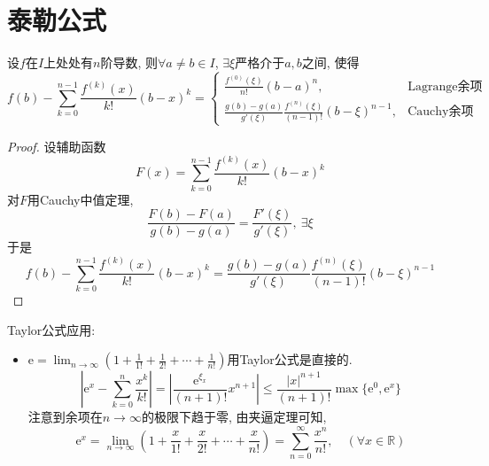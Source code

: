 
\section{泰勒公式}
\begin{theorem}
    设$f$在$I$上处处有$n$阶导数, 则$\forall a \neq b \in  I$, $\exists \xi $严格介于$a,b$之间, 使得
    \begin{equation}
      f\left( b \right) - \sum_{k=0}^{n-1} \frac{f^{(k)}\left( x \right) }{k!} \left( b-x \right) ^{k} =
      \begin{cases}
        \frac{f^{(0)}\left( \xi \right) }{n!} \left( b-a \right)^{n}, &\text{Lagrange余项}
        \\
        \frac{g\left( b \right) - g\left( a \right) }{g'\left( \xi \right) } \frac{f^{(n)}\left( \xi \right) }{\left( n-1 \right) !}\left( b - \xi \right) ^{n-1} ,& \text{Cauchy余项}
      \end{cases}
    \end{equation}
\end{theorem}
\begin{proof}
    设辅助函数
    \begin{equation}
      F\left( x \right) = \sum_{k=0}^{n-1} \frac{f^{(k)}\left( x \right) }{k!} \left( b-x \right) ^{k}
    \end{equation}
    对$F$用Cauchy中值定理, 
    \begin{equation}
      \frac{F\left( b \right) - F\left( a \right) }{g\left( b \right) - g\left( a \right) } = \frac{F'\left( \xi \right) }{g'\left( \xi \right) }, \ \exists \xi
    \end{equation}
    于是
    \begin{equation}
      f\left( b \right) - \sum_{k=0}^{n-1} \frac{f^{(k)}\left( x \right) }{k!} \left( b-x \right) ^{k} = \frac{g\left( b \right) - g\left( a \right) }{g'\left( \xi \right) } \frac{f^{(n)}\left( \xi \right) }{\left( n-1 \right) !}\left( b - \xi \right) ^{n-1}
    \end{equation}
\end{proof}

Taylor公式应用:
\begin{itemize}
    \item $\displaystyle \mathrm{e} = \lim_{n \to \infty}\left( 1 + \frac{1}{1!} + \frac{1}{2!} + \cdots + \frac{1}{n!} \right) $用Taylor公式是直接的.
    \begin{equation}
      \left| \mathrm{e}^{x} - \sum_{k=0}^{n} \frac{x^{k}}{k!} \right| = \left| \frac{\mathrm{e}^{\xi_{x}}}{\left( n+1 \right) !}x^{n+1} \right| \le \frac{\left| x \right| ^{n+1}}{\left( n+1 \right)!} \max \{ \mathrm{e}^{0}, \mathrm{e}^{x} \}
    \end{equation}
    注意到余项在$n\to \infty$的极限下趋于零, 由夹逼定理可知, 
    \begin{equation}
      \mathrm{e}^{x} = \lim_{n \to \infty} \left( 1 + \frac{x}{1!} + \frac{x}{2!} + \cdots + \frac{x}{n!} \right) = \sum_{n=0}^{\infty} \frac{x^{n}}{n!}, \quad \left( \forall x \in \mathbb{R} \right) 
    \end{equation}
\end{itemize}